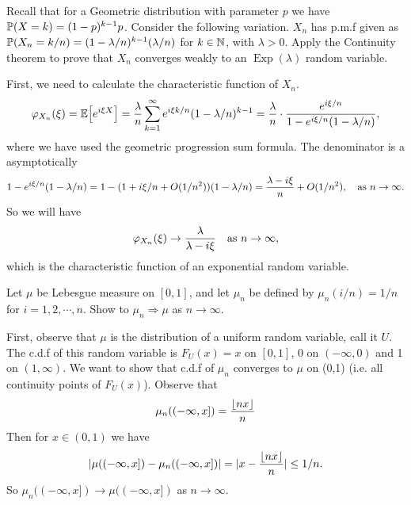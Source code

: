 \begin{problem}
	Recall that for a Geometric distribution with parameter $ p $ we have $ \prob(X = k) = (1-p)^{k-1}p $. Consider the following variation. $ X_n $ has p.m.f given as $ \prob(X_n = k/n) = (1-\lambda/n)^{k-1}(\lambda/n) $ for $ k\in \N $, with $ \lambda >0 $. Apply the Continuity theorem  to prove that $ X_n $ converges weakly to an $ \operatorname{Exp}(\lambda) $ random variable. 
\end{problem}
\begin{solution}
	First, we need to calculate the characteristic function of $ X_n $. 
	\[ \phi_{X_n}(\xi) = \E{e^{i\xi X}} = \frac{\lambda}{n}\sum_{k=1}^{\infty}e^{i\xi k /n} (1-\lambda/n)^{k-1} = \frac{\lambda}{n}\cdot \frac{e^{i\xi /n}}{1 - e^{i\xi /n}(1-\lambda/n)}, \]
	where we have used the geometric progression sum formula. The denominator is a asymptotically
	\[ 1 - e^{i\xi /n}(1-\lambda/n) = 1 - (1+i\xi/n + O(1/n^2))(1-\lambda/n) = \frac{\lambda - i\xi}{n} + O(1/n^2), \quad \text{as $ n\to\infty $}. \]  
	So we will have
	\[ \phi_{X_n} (\xi) \to \frac{\lambda}{\lambda - i \xi} \quad \text{as $ n\to\infty $}, \]
	which is the characteristic function of an exponential random variable.
\end{solution}

\begin{problem}
	Let $ \mu $ be Lebesgue measure on $ [0,1] $, and let $ \mu_n $ be defined by $ \mu_n (i/n) = 1/n $ for $ i=1,2,\cdots, n $. Show to $ \mu_n \Rightarrow \mu $  as $ n\to\infty $.
\end{problem}
\begin{solution}
	First, observe that $ \mu $ is the distribution of a uniform random variable, call it $ U $. The c.d.f of this random variable is $ F_U(x) = x $ on $ [0,1] $, 0 on $ (-\infty,0) $ and 1 on $ (1,\infty) $. We want to show that c.d.f of $ \mu_n $ converges to $ \mu $ on (0,1) (i.e. all continuity points of $ F_U(x) $). Observe that
	\[ \mu_n((-\infty, x]) = \frac{\floor{nx}}{n} \]
	Then for $ x\in (0,1) $ we have
	\[ \abs{\mu((-\infty,x]) - \mu_n((-\infty,x])} = \abs{x - \frac{\floor{nx}}{n}} \leq 1/n.  \]
	So $ \mu_n((-\infty, x]) \to \mu((-\infty, x]) $ as $ n\to\infty $.
\end{solution}


